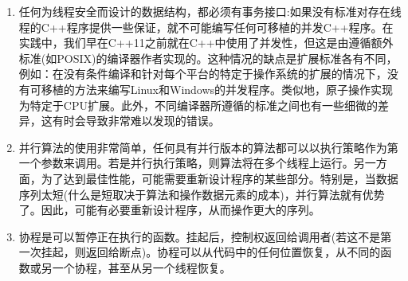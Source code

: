 \begin{enumerate}
\item 
任何为线程安全而设计的数据结构，都必须有事务接口:如果没有标准对存在线程的C++程序提供一些保证，就不可能编写任何可移植的并发C++程序。在实践中，我们早在C++11之前就在C++中使用了并发性，但这是由遵循额外标准(如POSIX)的编译器作者实现的。这种情况的缺点是扩展标准各有不同，例如：在没有条件编译和针对每个平台的特定于操作系统的扩展的情况下，没有可移植的方法来编写Linux和Windows的并发程序。类似地，原子操作实现为特定于CPU扩展。此外，不同编译器所遵循的标准之间也有一些细微的差异，这有时会导致非常难以发现的错误。

\item 
并行算法的使用非常简单，任何具有并行版本的算法都可以以执行策略作为第一个参数来调用。若是并行执行策略，则算法将在多个线程上运行。另一方面，为了达到最佳性能，可能需要重新设计程序的某些部分。特别是，当数据序列太短(什么是短取决于算法和操作数据元素的成本)，并行算法就有优势了。因此，可能有必要重新设计程序，从而操作更大的序列。

\item 
协程是可以暂停正在执行的函数。挂起后，控制权返回给调用者(若这不是第一次挂起，则返回给断点)。协程可以从代码中的任何位置恢复，从不同的函数或另一个协程，甚至从另一个线程恢复。

\end{enumerate}